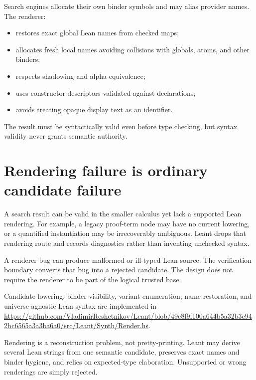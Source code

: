 \documentclass[10pt,letterpaper,oneside,openany]{report}
\begin{document}
Search engines allocate their own binder symbols and may alias provider names.  The renderer:

\begin{itemize}
\item restores exact global Lean names from checked maps;
\item allocates fresh local names avoiding collisions with globals, atoms, and other binders;
\item respects shadowing and alpha-equivalence;
\item uses constructor descriptors validated against declarations;
\item avoids treating opaque display text as an identifier.
\end{itemize}

The result must be syntactically valid even before type checking, but syntax validity never grants semantic authority.

\section{Rendering failure is ordinary candidate failure}

A search result can be valid in the smaller calculus yet lack a supported Lean rendering.  For example, a legacy proof-term node may have no current lowering, or a quantified instantiation may be irrecoverably ambiguous.  Leant drops that rendering route and records diagnostics rather than inventing unchecked syntax.

\begin{keyidea}
A renderer bug can produce malformed or ill-typed Lean source.  The verification boundary converts that bug into a rejected candidate.  The design does not require the renderer to be part of the logical trusted base.
\end{keyidea}

\begin{sourcebox}
Candidate lowering, binder visibility, variant enumeration, name restoration, and universe-agnostic Lean syntax are implemented in \url{https://github.com/VladimirReshetnikov/Leant/blob/49c8f9f100a644b5a32b3c942bc6565a3a3ba6a0/src/Leant/Synth/Render.hs}.
\end{sourcebox}

\begin{recapbox}
Rendering is a reconstruction problem, not pretty-printing.  Leant may derive several Lean strings from one semantic candidate, preserves exact names and binder hygiene, and relies on expected-type elaboration.  Unsupported or wrong renderings are simply rejected.
\end{recapbox}
\end{document}
